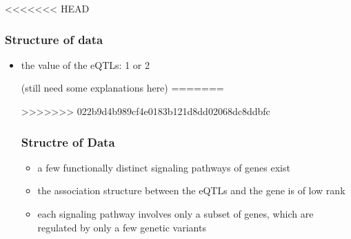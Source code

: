 <<<<<<< HEAD
\begin{frame}\frametitle{Structure of data}
    \begin{itemize}
        \item the value of the eQTLs: 1 or 2
    
        (still need some explanations here)
=======
    
>>>>>>> 022b9d4b989cf4e0183b121d8dd02068dc8ddbfc

      

\begin{frame}\frametitle{Structre of Data}
    \begin{itemize}
        \item a few functionally distinct signaling pathways of genes exist
        \item the association structure between the eQTLs and the gene is of low rank
        \item each signaling pathway involves only a subset of genes, which are regulated by only a few genetic variants
    \end{itemize}
\end{frame}
   


\end{itemize}
\end{frame}
